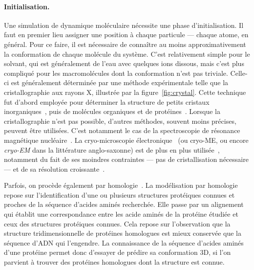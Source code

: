 	\paragraph{Initialisation.}
	Une simulation de dynamique moléculaire nécessite une phase d'initialisation. Il faut en premier lieu assigner une position à chaque particule --- chaque atome, en général. Pour ce faire, il est nécessaire de connaître au moins approximativement la conformation de chaque molécule du système. C'est relativement simple pour le solvant, qui est généralement de l'eau avec quelques ions dissous, mais c'est plus compliqué pour les macromolécules dont la conformation n'est pas triviale. Celle-ci est généralement déterminée par une méthode expérimentale telle que la cristallographie aux rayons X, illustrée par la figure~\ref{fig:crystal}. Cette technique fut d'abord employée pour déterminer la structure de petits cristaux inorganiques~\cite{friedrich1912sitzungsberichte, bragg1914reflexion, bragg1913structure, dickinson1923crystal}, puis de molécules organiques et de protéines~\cite{de1925interpretation, crowfoot1935x, kendrew1958three}. Lorsque la cristallographie n'est pas possible, d'autres méthodes, souvent moins précises, peuvent être utilisées. C'est notamment le cas de la spectroscopie de résonance magnétique nucléaire~\cite{clore1989determination, wuthrich1990protein, clore1991structures, wuthrich2001way}. La cryo-microscopie électronique~\cite{adrian1984cryo} (ou cryo-ME, ou encore \emph{cryo-EM} dans la littérature anglo-saxonne) est de plus en plus utilisée~\cite{kuhlbrandt2014cryo, callaway2015revolution}, notamment du fait de ses moindres contraintes --- pas de cristallisation nécessaire --- et de sa résolution croissante~\cite{dellisanti2015barrier, bartesaghi20152}.
	
	Parfois, on procède également par homologie~\cite{marti2000comparative, kaczanowski2010similar}. La modélisation par homologie repose sur l'identification d'une ou plusieurs structures protéiques connues et proches de la séquence d'acides aminés recherchée. Elle passe par un alignement qui établit une correspondance entre les acide aminés de la protéine étudiée et ceux des structures protéiques connues. Cela repose sur l'observation que la structure tridimensionnelle de protéines homologues est mieux conservée que la séquence d'ADN qui l'engendre. La connaissance de la séquence d'acides aminés d'une protéine permet donc d'essayer de prédire sa conformation 3D, si l'on parvient à trouver des protéines homologues dont la structure est connue.
	
